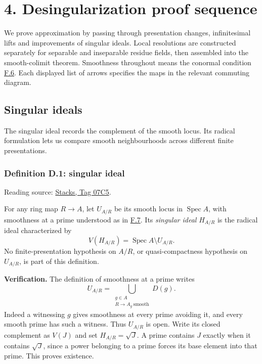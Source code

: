 \documentclass[11pt,a4paper,openany]{report}
\begin{document}
\section{4. Desingularization proof sequence}\label{AG-RG-S05-desingularization-proof-sequence}

We prove approximation by passing through presentation changes, infinitesimal lifts and improvements of singular ideals. Local resolutions are constructed separately for separable and inseparable residue fields, then assembled into the smooth-colimit theorem. Smoothness throughout means the conormal condition \hyperref[AG-RG-S05-algebra-definition-smooth]{F.6}. Each displayed list of arrows specifies the maps in the relevant commuting diagram.

\subsection{Singular ideals}\label{AG-RG-S05-singular-ideals}

\label{AG-RG-S05-smoothing-section-singular-ideal}

The singular ideal records the complement of the smooth locus. Its radical formulation lets us compare smooth neighbourhoods across different finite presentations.

\label{AG-RG-S05-smoothing-definition-singular-ideal}

\subsubsection{Definition D.1: singular ideal}\label{AG-RG-S05-definition-d.1-singular-ideal}

Reading source: \href{https://stacks.math.columbia.edu/tag/07C5}{Stacks, Tag 07C5}.

For any ring map \(R\to A\), let \(U_{A/R}\) be its smooth locus in \(\operatorname{Spec}A\), with smoothness at a prime understood as in \hyperref[AG-RG-S05-algebra-definition-smooth-at-prime]{F.7}. Its \emph{singular ideal} \(H_{A/R}\) is the radical ideal characterized by \[V(H_{A/R})=\operatorname{Spec}A\setminus U_{A/R}.\] No finite-presentation hypothesis on \(A/R\), or quasi-compactness hypothesis on \(U_{A/R}\), is part of this definition.

\textbf{Verification.} The definition of smoothness at a prime writes \[U_{A/R}=\bigcup_{\substack{g\in A\\ R\to A_g\ \mathrm{smooth}}}D(g).\] Indeed a witnessing \(g\) gives smoothness at every prime avoiding it, and every smooth prime has such a witness. Thus \(U_{A/R}\) is open. Write its closed complement as \(V(J)\) and set \(H_{A/R}=\sqrt J\). A prime contains \(J\) exactly when it contains \(\sqrt J\), since a power belonging to a prime forces its base element into that prime. This proves existence.
\end{document}
